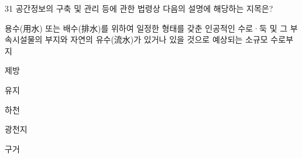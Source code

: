 \begin{question}{31}
공간정보의 구축 및 관리 등에 관한 법령상 다음의 설명에 해당하는 지목은?
\begin{framedtext}
용수(用水) 또는 배수(排水)를 위하여 일정한 형태를 갖춘 인공적인 수로·둑 및 그 부속시설물의 부지와 자연의 유수(流水)가 있거나 있을 것으로 예상되는 소규모 수로부지 \par
\end{framedtext}
\begin{choices}
  \item 제방
  \item 유지
  \item 하천
  \item 광천지
  \item 구거
\end{choices}
\end{question}

